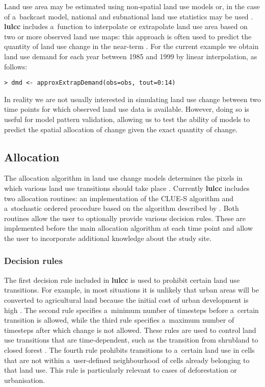 \documentclass[gmdd, online, hvmath]{copernicus}
\begin{document}
Land use area may be estimated using non-spatial land use models or, in the case of a~backcast model, national and subnational land use statistics may be used \citep[e.g.][]{ray2010,fuchs2013}. \textbf{lulcc} includes a~function to interpolate or extrapolate land use area based on two or more observed land use maps: this approach is often used to predict the quantity of land use change in the near-term \citep{mas2014}. For the current example we obtain land use demand for each year between 1985 and 1999 by linear interpolation, as follows:
\begin{verbatim}
> dmd <- approxExtrapDemand(obs=obs, tout=0:14)
\end{verbatim}\hack{\noindent}In reality we are not usually interested in simulating land use change between two time points for which observed land use data is available. However, doing so is useful for model pattern validation, allowing us to test the ability of models to predict the spatial allocation of change given the exact quantity of change. \\

\subsection{Allocation}
The allocation algorithm in land use change models determines the pixels in which various land use transitions should take place \citep{verburg2002}. Currently \textbf{lulcc} includes two allocation routines: an implementation of the CLUE-S algorithm and a~stochastic ordered procedure based on the algorithm described by \citet{fuchs2013}. Both routines allow the user to optionally provide various decision rules. These are implemented before the main allocation algorithm at each time point and allow the user to incorporate additional knowledge about the study site. \\

\subsubsection{Decision rules}

The first decision rule included in \textbf{lulcc} is used to prohibit certain land use transitions. For example, in most situations it is unlikely that urban areas will be converted to agricultural land because the initial cost of urban development is high \citep{verburg2002}. The second rule specifies a~minimum number of timesteps before a~certain transition is allowed, while the third rule specifies a~maximum number of timesteps after which change is not allowed. These rules are used to control land use transitions that are time-dependent, such as the transition from shrubland to closed forest \citep{verburg2009}. The fourth rule prohibits transitions to a~certain land use in cells that are not within a~user-defined neighbourhood of cells already belonging to that land use. This rule is particularly relevant to cases of deforestation or urbanisation. \\
\end{document}
